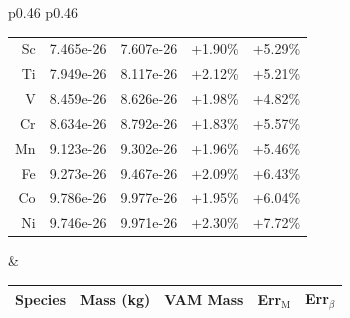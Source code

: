 \documentclass[12pt]{article}
\begin{document}
\begin{table}[htbp]
\begin{tabular}{p{0.46\linewidth} p{0.46\linewidth}}
\begin{tabular}{|rllrr|}
Sc  & 7.465e-26 & 7.607e-26     & +1.90\% \tikz[baseline=-0.5ex]{\node[draw=none,fill=green,circle,inner sep=3pt]{};}          & +5.29\% \tikz[baseline=-0.5ex]{\node[draw=none,fill=orange,circle,inner sep=3pt]{};}  \\
Ti  & 7.949e-26 & 8.117e-26     & +2.12\% \tikz[baseline=-0.5ex]{\node[draw=none,fill=green,circle,inner sep=3pt]{};}          & +5.21\% \tikz[baseline=-0.5ex]{\node[draw=none,fill=orange,circle,inner sep=3pt]{};}  \\
V   & 8.459e-26 & 8.626e-26     & +1.98\% \tikz[baseline=-0.5ex]{\node[draw=none,fill=green,circle,inner sep=3pt]{};}          & +4.82\% \tikz[baseline=-0.5ex]{\node[draw=none,fill=orange,circle,inner sep=3pt]{};}  \\
Cr  & 8.634e-26 & 8.792e-26     & +1.83\% \tikz[baseline=-0.5ex]{\node[draw=none,fill=green,circle,inner sep=3pt]{};}          & +5.57\% \tikz[baseline=-0.5ex]{\node[draw=none,fill=orange,circle,inner sep=3pt]{};}  \\
Mn  & 9.123e-26 & 9.302e-26     & +1.96\% \tikz[baseline=-0.5ex]{\node[draw=none,fill=green,circle,inner sep=3pt]{};}          & +5.46\% \tikz[baseline=-0.5ex]{\node[draw=none,fill=orange,circle,inner sep=3pt]{};}  \\
Fe  & 9.273e-26 & 9.467e-26     & +2.09\% \tikz[baseline=-0.5ex]{\node[draw=none,fill=green,circle,inner sep=3pt]{};}          & +6.43\% \tikz[baseline=-0.5ex]{\node[draw=none,fill=orange,circle,inner sep=3pt]{};}  \\
Co  & 9.786e-26 & 9.977e-26     & +1.95\% \tikz[baseline=-0.5ex]{\node[draw=none,fill=green,circle,inner sep=3pt]{};}          & +6.04\% \tikz[baseline=-0.5ex]{\node[draw=none,fill=orange,circle,inner sep=3pt]{};}  \\
Ni  & 9.746e-26 & 9.971e-26     & +2.30\% \tikz[baseline=-0.5ex]{\node[draw=none,fill=green,circle,inner sep=3pt]{};}          & +7.72\% \tikz[baseline=-0.5ex]{\node[draw=none,fill=orange,circle,inner sep=3pt]{};}  \\

\bottomrule
\end{tabular} &
\begin{tabular}{|rllrr|}
\toprule
Species & Mass (kg) & VAM Mass & Err$_\text{M}$ & Err$_\beta$ \\
\midrule


\end{tabular}
\end{tabular}
\end{table}
\end{document}
